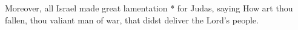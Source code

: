 Moreover, all Israel made great lamentation * for Judas, saying How art thou fallen, thou valiant man of war, that didst deliver the Lord's people.